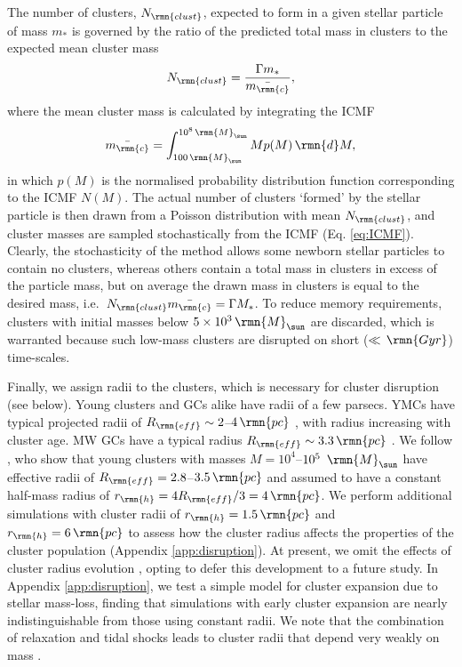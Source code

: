 \documentclass[fleqn,usenatbib]{mnras}
\newcommand\Msun{\,\rmn{M}_{\sun}}
\newcommand\Gyr{\,\rmn{Gyr}}
\newcommand\pc{\,\rmn{pc}}
\begin{document}
The number of clusters, $N_\rmn{clust}$, expected to form in a given stellar particle of mass $m_*$ is governed by the ratio of the predicted total mass in clusters to the expected mean cluster mass
\begin{equation} \label{eq:nclust}
N_\rmn{clust} = \frac{\Gamma m_*} {\bar{m_\rmn{c}}} ,
\end{equation}
where the mean cluster mass is calculated by integrating the ICMF
\begin{equation} \label{eq:mcmean}
\bar{m_\rmn{c}} = \int^{10^8 \Msun}_{100 \Msun} M p(M) \, \rmn{d}M ,
\end{equation}
in which $p(M)$ is the normalised probability distribution function corresponding to the ICMF $N(M)$. The actual number of clusters `formed' by the stellar particle is then drawn from a Poisson distribution with mean $N_\rmn{clust}$, and cluster masses are sampled stochastically from the ICMF (Eq. \ref{eq:ICMF}). Clearly, the stochasticity of the method allows some newborn stellar particles to contain no clusters, whereas others contain a total mass in clusters in excess of the particle mass, but on average the drawn mass in clusters is equal to the desired mass, i.e.~$N_\rmn{clust}\bar{m_\rmn{c}}=\Gamma M_*$. To reduce memory requirements, clusters with initial masses below $5 \times 10^3 \Msun$ are discarded, which is warranted because such low-mass clusters are disrupted on short ($\ll\Gyr$) time-scales.

Finally, we assign radii to the clusters, which is necessary for cluster disruption (see below). Young clusters and GCs alike have radii of a few parsecs. YMCs have typical projected radii of $R_\rmn{eff} \sim 2$--$4 \pc$ \citep{Larsen_04,Bastian_et_al_12, Johnson_et_al_12}, with radius increasing with cluster age.
MW GCs have a typical radius $R_\rmn{eff} \sim 3.3 \pc$ \citep{McLaughlin_and_van_der_Marel_05}.
We follow \citet{Larsen_04}, who show that young clusters with masses $M=10^4$--$10^5~\Msun$ have effective radii of $R_\rmn{eff}=2.8$--$3.5 \pc$ and assumed to have a constant half-mass radius of $r_\rmn{h}=4R_\rmn{eff}/3=4 \pc$.
We perform additional simulations with cluster radii of $r_\rmn{h} = 1.5 \pc$ and $r_\rmn{h} = 6 \pc$ to assess how the cluster radius affects the properties of the cluster population (Appendix \ref{app:disruption}). At present, we omit the effects of cluster radius evolution \citep[e.g.][]{Gieles_Heggie_and_Zhao_11}, opting to defer this development to a future study. In Appendix \ref{app:disruption}, we test a simple model for cluster expansion due to stellar mass-loss, finding that simulations with early cluster expansion are nearly indistinguishable from those using constant radii. We note that the combination of relaxation and tidal shocks leads to cluster radii that depend very weakly on mass \citep{Gieles_and_Renaud_16}.
\end{document}

